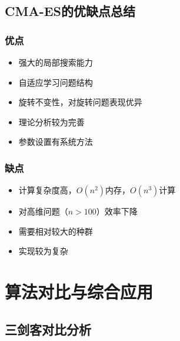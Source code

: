\subsection{CMA-ES的优缺点总结}

\subsubsection{优点}
\begin{itemize}
    \item 强大的局部搜索能力
    \item 自适应学习问题结构
    \item 旋转不变性，对旋转问题表现优异
    \item 理论分析较为完善
    \item 参数设置有系统方法
\end{itemize}

\subsubsection{缺点}
\begin{itemize}
    \item 计算复杂度高，$O(n^2)$内存，$O(n^3)$计算
    \item 对高维问题（$n>100$）效率下降
    \item 需要相对较大的种群
    \item 实现较为复杂
\end{itemize}

\section{算法对比与综合应用}

\subsection{三剑客对比分析}

